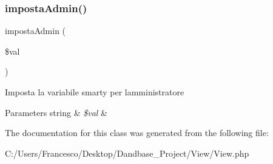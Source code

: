 \subsubsection{\texorpdfstring{imposta\+Admin()}{impostaAdmin()}}
{\footnotesize\ttfamily imposta\+Admin (\begin{DoxyParamCaption}\item[{}]{\$val }\end{DoxyParamCaption})}

Imposta la variabile smarty per l\textquotesingle{}amministratore


\begin{DoxyParams}[1]{Parameters}
string & {\em \$val} & \\
\hline
\end{DoxyParams}


The documentation for this class was generated from the following file\+:\begin{DoxyCompactItemize}
\item 
C\+:/\+Users/\+Francesco/\+Desktop/\+Dandbase\+\_\+\+Project/\+View/View.\+php\end{DoxyCompactItemize}
